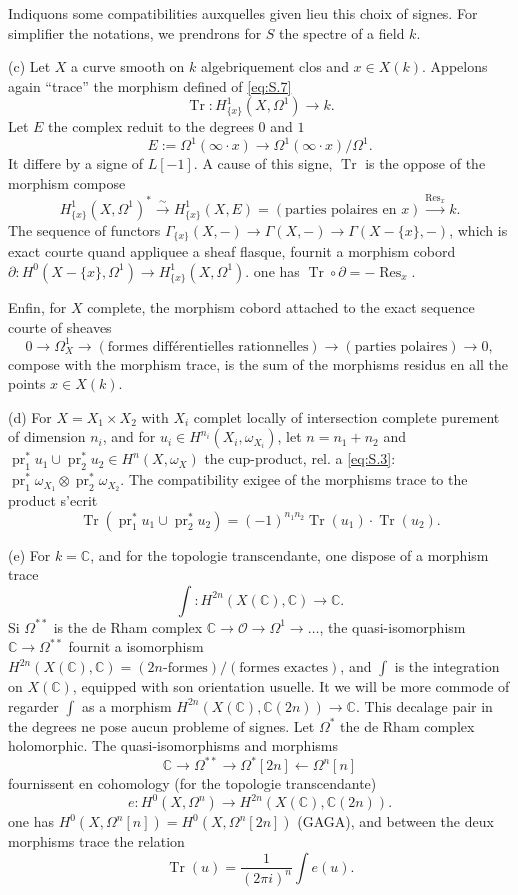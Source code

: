 \documentclass[12pt,a4paper]{article}
\theoremstyle{plain}
\theoremstyle{definition}
\theoremstyle{remark}
\DeclareMathOperator{\Res}{Res}
\DeclareMathOperator{\Tr}{Tr}
\newcommand{\CC}{\mathbb{C}}
\newcommand{\OO}{\mathcal{O}}
\DeclareMathOperator{\pr}{pr}
\providecommand{\CC}{\mathbb{C}}
\providecommand{\pr}{\operatorname{pr}}
\providecommand{\Tr}{\operatorname{Tr}}
\begin{document}
Indiquons some compatibilities auxquelles given lieu this choix of signes.
For simplifier the notations, we prendrons for $S$ the spectre of a field $k$.

(c) Let $X$ a curve smooth on $k$ algebriquement clos and $x\in X(k)$. Appelons
again ``trace'' the morphism defined of \eqref{eq:S.7}
\[
\Tr:H^1_{\{x\}}(X,\Omega^1)\to k.
\]
Let $E$ the complex reduit to the degrees $0$ and $1$
\[
E:=\Omega^1(\infty\cdot x)\to\Omega^1(\infty\cdot x)/\Omega^1.
\]
It differe by a signe of $L[-1]$. A cause of this signe, $\Tr$ is the oppose of the morphism compose
\[
H^1_{\{x\}}(X,\Omega^1)^*\xrightarrow{\sim} H^1_{\{x\}}(X,E)=(\text{parties polaires en }x)\xrightarrow{\Res_x}k.
\]
The sequence of functors
$\Gamma_{\{x\}}(X,-)\to\Gamma(X,-)\to\Gamma(X-\{x\},-)$, which is exact courte quand
appliquee a sheaf flasque, fournit a morphism cobord
$\partial:H^0(X-\{x\},\Omega^1)\to H^1_{\{x\}}(X,\Omega^1)$. one has $\Tr\circ\partial=-\Res_x$.

Enfin, for $X$ complete, the morphism cobord attached to the exact sequence courte
of sheaves
\[
0\to\Omega^1_X\to(\text{formes différentielles rationnelles})\to(\text{parties polaires})\to 0,
\]
compose with the morphism trace, is the sum of the morphisms residus en all
the points $x\in X(k)$.

(d) For $X=X_1\times X_2$ with $X_i$ complet locally of intersection complete
purement of dimension $n_i$, and for $u_i\in H^{n_i}(X_i,\omega_{X_i})$, let
$n=n_1+n_2$ and $\pr_1^*u_1\cup\pr_2^*u_2\in H^n(X,\omega_X)$ the cup-product, rel.
a \eqref{eq:S.3}:
$\pr_1^*\omega_{X_1}\otimes\pr_2^*\omega_{X_2}$. The compatibility exigee of the morphisms trace
to the product s'ecrit
\[
\Tr(\pr_1^*u_1\cup\pr_2^*u_2)=(-1)^{n_1n_2}\Tr(u_1)\cdot\Tr(u_2).
\]

(e) For $k=\CC$, and for the topologie transcendante, one dispose of a morphism
trace
\[
\textstyle\int:H^{2n}(X(\CC),\CC)\to\CC.
\]
Si $\Omega^{**}$ is the de Rham complex $\CC\to\OO\to\Omega^1\to\dots$, the
quasi-isomorphism $\CC\to\Omega^{**}$ fournit a isomorphism
$H^{2n}(X(\CC),\CC)=(2n\text{-formes})/(\text{formes exactes})$, and $\int$ is
the integration on $X(\CC)$, equipped with son orientation usuelle. It we will be more commode
of regarder $\int$ as a morphism $H^{2n}(X(\CC),\CC(2n))\to\CC$. This decalage
pair in the degrees ne pose aucun probleme of signes. Let $\Omega^*$ the de Rham complex holomorphic. The quasi-isomorphisms and morphisms
\[
\CC\to\Omega^{**}\to\Omega^*[2n]\leftarrow\Omega^n[n]
\]
fournissent en cohomology (for the topologie transcendante)
\[
e:H^0(X,\Omega^n)\to H^{2n}(X(\CC),\CC(2n)).
\]
one has $H^0(X,\Omega^n[n])=H^0(X,\Omega^n[2n])$ (GAGA), and between the deux morphisms
trace the relation
\[
\Tr(u)=\frac{1}{(2\pi i)^n}\int e(u).
\]
\end{document}
